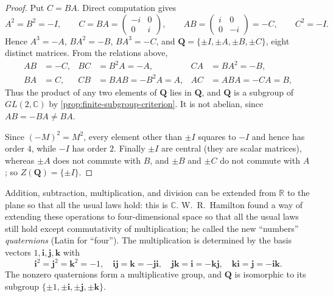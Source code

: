 \begin{proof}
	Put \(C = BA\). Direct computation gives
	\[
		A^2 = B^2 = -I, \qquad
		C = BA = \begin{pmatrix} -i & 0 \\ 0 & i \end{pmatrix}, \qquad
		AB = \begin{pmatrix} i & 0 \\ 0 & -i \end{pmatrix} = -C, \qquad C^2 = -I.
	\]
	Hence \(A^3 = -A\), \(BA^2 = -B\), \(BA^3 = -C\), and
	\(\mathbf Q = \{\pm I, \pm A, \pm B, \pm C\}\), eight distinct matrices. From the
	relations above,
	\begin{align*}
		AB & = -C,             & BC & = B^2A = -A,        & CA & = BA^2 = -B,     \\
		BA & = C,              & CB & = BAB = -B^2A = A,  & AC & = ABA = -CA = B,
	\end{align*}
	Thus the product of any two elements of \(\mathbf Q\) lies in
	\(\mathbf Q\), and \(\mathbf Q\) is a subgroup of \(GL(2,\mathbb C)\) by
	\autoref{prop:finite-subgroup-criterion}. It is not abelian, since \(AB = -BA \neq BA\).

	Since \((-M)^2 = M^2\), every element other than \(\pm I\) squares to \(-I\) and hence has
	order \(4\), while \(-I\) has order \(2\). Finally \(\pm I\) are central (they are scalar
	matrices), whereas \(\pm A\) does not commute with \(B\), and \(\pm B\) and \(\pm C\) do
	not commute with \(A\); so \(Z(\mathbf Q) = \{\pm I\}\).
\end{proof}

\begin{note}
	Addition, subtraction, multiplication, and division can be extended from \(\mathbb R\) to
	the plane so that all the usual laws hold: this is \(\mathbb C\). W.~R.~Hamilton found
	a way of extending these operations to four-dimensional space so that all the usual
	laws still hold except commutativity of multiplication; he called the new ``numbers''
	\emph{quaternions} (Latin for ``four''). The multiplication is determined by the basis
	vectors \(1, \mathbf i, \mathbf j, \mathbf k\) with
	\[
		\mathbf i^2 = \mathbf j^2 = \mathbf k^2 = -1, \quad
		\mathbf{ij} = \mathbf k = -\mathbf{ji}, \quad
		\mathbf{jk} = \mathbf i = -\mathbf{kj}, \quad
		\mathbf{ki} = \mathbf j = -\mathbf{ik}.
	\]
	The nonzero quaternions form a multiplicative group, and \(\mathbf Q\) is isomorphic to
	its subgroup \(\{\pm 1, \pm\mathbf i, \pm\mathbf j, \pm\mathbf k\}\).
\end{note}

